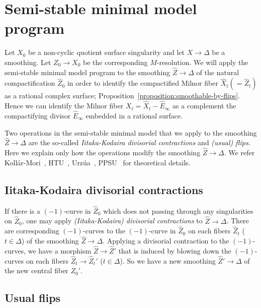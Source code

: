 \documentclass[reqno, twoside, a4paper]{amsart}
\theoremstyle{definition}
\numberwithin{equation}{section}
\begin{document}
\section{Semi-stable minimal model program}
\label{section:MMP}

Let $X_0$ be a non-cyclic quotient surface singularity and let $X \to \Delta$ be a smoothing. Let $Z_0 \to X_0$ be the corresponding $M$-resolution. We will apply the semi-stable minimal model program to the smoothing $\widehat{Z} \to \Delta$ of the natural compactification $\widehat{Z}_0$ in order to identify the compactified Milnor fiber $\widehat{X}_t (= \widehat{Z}_t)$ as a rational complex surface; Proposition~\ref{proposition:smoothable-by-flips}. Hence we can identify the Milnor fiber $X_t=\widehat{X}_t - \widehat{E}_{\infty}$ as a complement the compactifying divisor $\widehat{E}_{\infty}$ embedded in a rational surface.

Two operations in the semi-stable minimal model that we apply to the smoothing $\widehat{Z} \to \Delta$ are the so-called \emph{Iitaka-Kodaira divisorial contractions} and \emph{(usual) flips}. Here we explain only how the operations modify the smoothing $\widehat{Z} \to \Delta$. We refer Koll\'ar-Mori~\cite{Kollar-Mori-1992}, HTU~\cite{Hacking-Tevelev-Urzua-2013}, Urz\'ua~\cite{Urzua-2013}, PPSU~\cite{PPSU-2015} for theoretical details.






\subsection{Iitaka-Kodaira divisorial contractions}

If there is a $(-1)$-curve in $\widehat{Z}_0$ which does not passing through any singularities on $\widehat{Z}_0$, one may apply \emph{(Iitaka-Kodaira) divisorial contractions} to $\widehat{Z} \to \Delta$. There are corresponding $(-1)$-curves to the $(-1)$-curve in $\widehat{Z}_0$ on each fibers $\widehat{Z}_t$ ($t \in \Delta$) of the smoothing $\widehat{Z} \to \Delta$. Applying a divisorial contraction to the $(-1)$-curves, we have a morphism $\widehat{Z} \to \widehat{Z}'$ that is induced by blowing down the $(-1)$-curves on each fibers $\widehat{Z}_t \to \widehat{Z}_t'$ ($t \in \Delta$). So we have a new smoothing $\widehat{Z}' \to \Delta$ of the new central fiber $Z_0'$.





\subsection{Usual flips}
\end{document}
